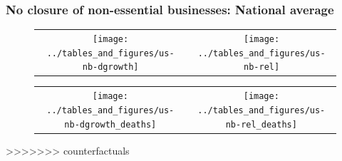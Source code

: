 \documentclass{beamer}
\begin{document}
\begin{frame}
  \frametitle{No closure of non-essential businesses: National average}

\begin{figure}[ht]
  \begin{minipage}{\linewidth}
    \centering
    \begin{tabular}{cc}
      \texttt{[image: ../tables\_and\_figures/us-nb-dgrowth]}
      &
        \texttt{[image: ../tables\_and\_figures/us-nb-rel]}
    \end{tabular}
  \end{minipage}
\end{figure}

\begin{figure}[ht]
  \begin{minipage}{\linewidth}
    \centering
    \begin{tabular}{cc}
      \texttt{[image: ../tables\_and\_figures/us-nb-dgrowth\_deaths]}
      &
        \texttt{[image: ../tables\_and\_figures/us-nb-rel\_deaths]}
    \end{tabular}
  \end{minipage}
\end{figure}


>>>>>>> counterfactuals
\end{frame}
\end{document}
